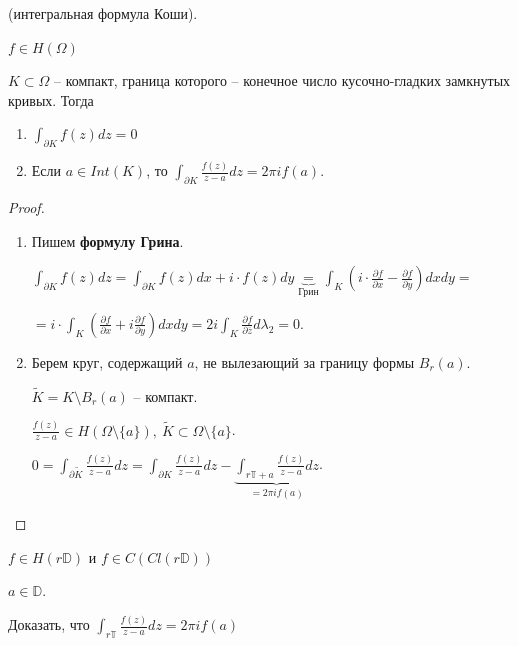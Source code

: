 \begin{theorem}
    (интегральная формула Коши).

    $f \in H(\Omega)$

    $K \subset \Omega$ -- компакт, граница которого -- конечное число кусочно-гладких замкнутых кривых. Тогда

    \begin{enumerate}
        \item {
            $\int_{\partial K} { f(z) dz } = 0$
        }
        \item {
            Если $a \in Int (K)$, то $\int_{\partial K} { \frac{f(z)}{z - a} dz } = 2 \pi i f(a)$.
        }
    \end{enumerate}
\end{theorem}
\begin{proof}
    \begin{enumerate}
        \item {
            Пишем \textbf{формулу Грина}.

            $\int_{\partial K} { f(z) dz } = \int_{\partial K} { f(z) dx + i \cdot f(z) dy } \underbrace{=}_{\text{Грин}} \int_{K} { \left( i \cdot \frac{\partial f}{\partial x}  - \frac{\partial f}{\partial y} \right) dx dy } = $

            $ = i \cdot \int_{K} {\left( \frac{\partial f}{\partial x} + i \frac{\partial f}{\partial y} \right) dx dy} = 2 i \int_{K} { \frac{\partial f}{\partial \overline{z}} d \lambda_2 } = 0$.
        }
        \item {
            Берем круг, содержащий $a$, не вылезающий за границу формы $B_r(a)$.

            $\tilde{K} = K \setminus B_r(a)$ -- компакт.

            $\frac{f(z)}{z - a} \in H(\Omega \setminus \{ a \}), \ \tilde{K} \subset \Omega \setminus \{ a \}$.

            $0 = \int_{\partial \tilde{K}} { \frac{f(z)}{z - a} dz } = \int_{\partial K} { \frac{f(z)}{z - a} dz } - \underbrace{\int_{r \mathbb{T} + a} { \frac{f(z)}{z - a} dz }}_{= 2\pi i f(a)}$.
        }
    \end{enumerate}
\end{proof}
\begin{exerc}
    $f \in H(r \mathbb{D})$ и $f \in C(Cl (r \mathbb{D}))$

    $a \in \mathbb{D}$.

    Доказать, что $\int_{r \mathbb{T}} { \frac{f(z)}{z - a} dz } = 2 \pi i f(a)$
\end{exerc}

